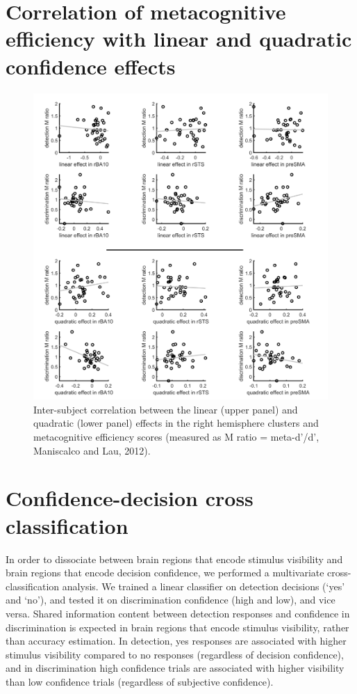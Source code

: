 \documentclass[12pt,twoside]{reedthesis}
\begin{document}
\hypertarget{app3-efficiency}{%
\section{Correlation of metacognitive efficiency with linear and quadratic confidence effects}\label{app3-efficiency}}
\begin{figure}[H]
\includegraphics[width=\linewidth]{figure/fMRI/efficiency} \caption[Inter-subject correlation between the linear and quadratic effects in the right hemisphere clusters and metacognitive efficiency scores]{Inter-subject correlation between the linear (upper panel) and quadratic (lower panel) effects in the right hemisphere clusters and metacognitive efficiency scores (measured as M ratio = meta-d'/d', Maniscalco and Lau, 2012).}\label{fig:varianceRatio}
\end{figure}
\newpage

\hypertarget{app3-cross}{%
\section{Confidence-decision cross classification}\label{app3-cross}}

In order to dissociate between brain regions that encode stimulus visibility and brain regions that encode decision confidence, we performed a multivariate cross-classification analysis. We trained a linear classifier on detection decisions (`yes' and `no'), and tested it on discrimination confidence (high and low), and vice versa. Shared information content between detection responses and confidence in discrimination is expected in brain regions that encode stimulus visibility, rather than accuracy estimation. In detection, yes responses are associated with higher stimulus visibility compared to no responses (regardless of decision confidence), and in discrimination high confidence trials are associated with higher visibility than low confidence trials (regardless of subjective confidence).
\end{document}
